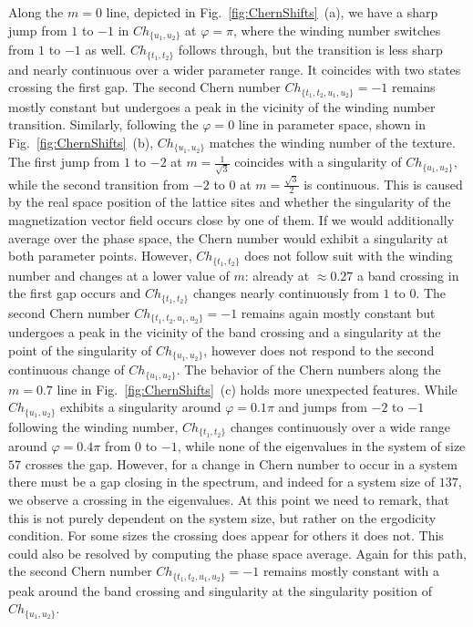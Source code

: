\documentclass[submission, Phys]{SciPost}
\begin{document}
Along the $m=0$ line, depicted in Fig.~\ref{fig:ChernShifts}~(a), we have a sharp jump from $1$ to $-1$ in $Ch_{\lbrace u_1, u_2 \rbrace }$ at $\varphi=\pi$, where the winding number switches from $1$ to $-1$ as well.
$Ch_{\lbrace t_1, t_2 \rbrace }$ follows through, but the transition is less sharp and nearly continuous over a wider parameter range.
It coincides with two states crossing the first gap.
The second Chern number $Ch_{\lbrace t_1, t_2, u_1, u_2 \rbrace }=-1$ remains mostly constant but undergoes a peak in the vicinity of the winding number transition.
Similarly, following the $\varphi=0$ line in parameter space, shown in Fig.~\ref{fig:ChernShifts}~(b), $Ch_{\lbrace u_1, u_2 \rbrace }$ matches the winding number of the texture. The first jump from $1$ to $-2$ at $m=\frac{1}{\sqrt{3}}$ coincides with a singularity of $Ch_{\lbrace u_1, u_2 \rbrace }$, while the second transition from $-2$ to $0$ at $m=\frac{\sqrt{3}}{2}$ is continuous.
This is caused by the real space position of the lattice sites and whether the singularity of the magnetization vector field occurs close by one of them. If we would additionally average over the phase space, the Chern number would exhibit a singularity at both parameter points.
However, $Ch_{\lbrace t_1, t_2 \rbrace }$ does not follow suit with the winding number and changes at a lower value of $m$: already at $\approx0.27$ a band crossing in the first gap occurs and $Ch_{\lbrace t_1, t_2 \rbrace }$ changes nearly continuously from $1$ to $0$.
The second Chern number $Ch_{\lbrace t_1, t_2, u_1, u_2 \rbrace }=-1$ remains again mostly constant but undergoes a peak in the vicinity of the band crossing and a singularity at the point of the singularity of $Ch_{\lbrace u_1, u_2 \rbrace }$, however does not respond to the second continuous change of $Ch_{\lbrace u_1, u_2 \rbrace }$.
The behavior of the Chern numbers along the $m=0.7$ line in Fig.~\ref{fig:ChernShifts}~(c) holds more unexpected features.
While $Ch_{\lbrace u_1, u_2 \rbrace }$ exhibits a singularity around $\varphi=0.1\pi$ and jumps from $-2$ to $-1$ following the winding number, $Ch_{\lbrace t_1, t_2 \rbrace }$ changes continuously over a wide range around $\varphi=0.4\pi$ from $0$ to $-1$, while none of the eigenvalues in the system of size $57$ crosses the gap. 
However, for a change in Chern number to occur in a system there must be a gap closing \cite{Bellissard1995} in the spectrum, and indeed for a system size of $137$, we observe a crossing in the eigenvalues.
At this point we need to remark, that this is not purely dependent on the system size, but rather on the ergodicity condition. For some sizes the crossing does appear for others it does not. This could also be resolved by computing the phase space average.
Again for this path, the second Chern number $Ch_{\lbrace t_1, t_2, u_1, u_2 \rbrace }=-1$ remains mostly constant with a peak around the band crossing and singularity at the singularity position of $Ch_{\lbrace u_1, u_2 \rbrace }$.
\end{document}
